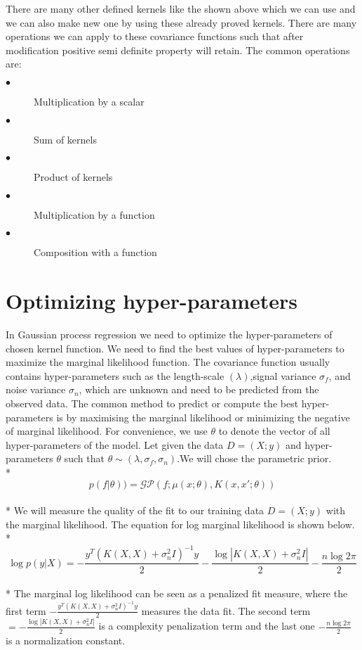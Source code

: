 \documentclass{article}
\begin{document}
There are many other defined kernels like the shown above which we can use and we can also make new one by using these already proved kernels. There are many operations we can apply to these covariance functions such that after modification positive semi definite property will retain. The common operations are:
\begin{description}
\item[$\bullet$] Multiplication by a scalar
\item[$\bullet$] Sum of kernels
\item[$\bullet$] Product of kernels
\item[$\bullet$] Multiplication by a function
\item[$\bullet$] Composition with a function
\end{description}
\section{Optimizing hyper-parameters}
In Gaussian process regression we need to optimize the hyper-parameters of chosen kernel function. We need to find the best values of hyper-parameters to maximize the marginal likelihood function. The covariance function usually contains hyper-parameters such as the length-scale $(\lambda)$,signal variance $\sigma_f$, and noise variance $\sigma_n$, which are unknown and need to be predicted from the observed data. The common method to predict or compute the best hyper-parameters is by maximising the marginal likelihood or minimizing the negative of marginal likelihood. For convenience, we use $\theta$  to denote the vector of all hyper-parameters of the model. Let given the data $D={(X; y)}$ and hyper-parameters $\theta$ such that $\theta\sim(\lambda,\sigma_f,\sigma_n)$.We will chose the parametric prior.
\\*
$${p(f|\theta))}= \mathcal{GP}{\left(f;\mu(x;\theta),K(x,x';\theta)\right)}$$
\\*
We will measure the quality of the fit to our training data $D = (X; y)$ with the marginal likelihood. The equation for log marginal likelihood is shown below. 
\\*
$$\log{p(y|X)} = -\frac{{y^T}{(K(X,X)+\sigma_n^2I)^{-1}}{y}}{2} - \frac{\log|{K(X,X)+\sigma_n^2I}|}{2} - \frac{n\log{2\pi}}{2}$$
\\*
The marginal log likelihood can be seen as a penalized fit measure,
where the first term $-\frac{{y^T}{(K(X,X)+\sigma_n^2I)^{-1}}{y}}{2}$ measures the data fit. The second term $=-\frac{\log|{K(X,X)+\sigma_n^2I}|}{2}$ is a complexity penalization term and the last one $- \frac{n\log{2\pi}}{2}$ is a normalization constant.
\end{document}
